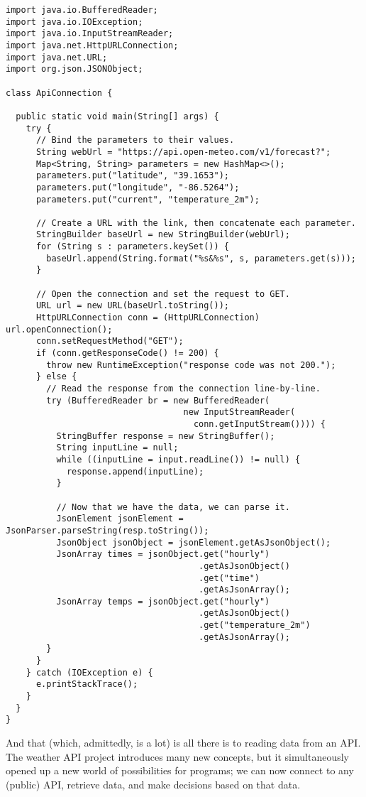 \begin{lstlisting}[language=MyJava]
import java.io.BufferedReader;
import java.io.IOException;
import java.io.InputStreamReader;
import java.net.HttpURLConnection;
import java.net.URL;
import org.json.JSONObject;

class ApiConnection {

  public static void main(String[] args) {
    try {
      // Bind the parameters to their values.
      String webUrl = "https://api.open-meteo.com/v1/forecast?";
      Map<String, String> parameters = new HashMap<>();
      parameters.put("latitude", "39.1653");
      parameters.put("longitude", "-86.5264");
      parameters.put("current", "temperature_2m");

      // Create a URL with the link, then concatenate each parameter.
      StringBuilder baseUrl = new StringBuilder(webUrl);
      for (String s : parameters.keySet()) { 
        baseUrl.append(String.format("%s&%s", s, parameters.get(s))); 
      }
    
      // Open the connection and set the request to GET.
      URL url = new URL(baseUrl.toString());
      HttpURLConnection conn = (HttpURLConnection) url.openConnection();
      conn.setRequestMethod("GET");
      if (conn.getResponseCode() != 200) {
        throw new RuntimeException("response code was not 200.");
      } else {
        // Read the response from the connection line-by-line.
        try (BufferedReader br = new BufferedReader(
                                   new InputStreamReader(
                                     conn.getInputStream()))) {
          StringBuffer response = new StringBuffer();
          String inputLine = null;
          while ((inputLine = input.readLine()) != null) {
            response.append(inputLine); 
          }

          // Now that we have the data, we can parse it.
          JsonElement jsonElement = JsonParser.parseString(resp.toString());
          JsonObject jsonObject = jsonElement.getAsJsonObject();
          JsonArray times = jsonObject.get("hourly")
                                      .getAsJsonObject()
                                      .get("time")
                                      .getAsJsonArray();
          JsonArray temps = jsonObject.get("hourly")
                                      .getAsJsonObject()
                                      .get("temperature_2m")
                                      .getAsJsonArray();
        }
      }
    } catch (IOException e) {
      e.printStackTrace();
    }
  }
}
\end{lstlisting}

And that (which, admittedly, is a lot) is all there is to reading data from an API. 
The weather API project introduces many new concepts, but it simultaneously opened up a new world of possibilities for programs; we can now connect to any (public) API, retrieve data, and make decisions based on that data.